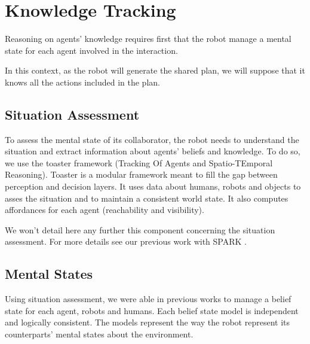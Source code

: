 \documentclass{llncs}
\begin{document}















\section{Knowledge Tracking}
Reasoning on agents' knowledge requires first that the robot manage a mental state for each agent involved in the interaction.

In this context, as the robot will generate the shared plan, we will suppose that it knows all the actions included in the plan.

\subsection{Situation Assessment}
To assess the mental state of its collaborator, the robot needs to understand the situation and extract information about agents' beliefs and knowledge.
To do so, we use the toaster framework (Tracking Of Agents and Spatio-TEmporal Reasoning). Toaster is a modular framework meant to fill the gap between perception and decision layers. It uses data about humans, robots and objects to asses the situation and to maintain a consistent world state. It also computes affordances for each agent (reachability and visibility).

We won't detail here any further this component concerning the situation assessment.
For more details see our previous work with SPARK \cite{Milliez2014}.

\subsection{Mental States}
Using situation assessment, we were able in previous works to manage a belief state for each agent, robots and humans. Each belief state model is independent and logically consistent. The models represent the way the robot represent its counterparts' mental states about the environment.
\end{document}
